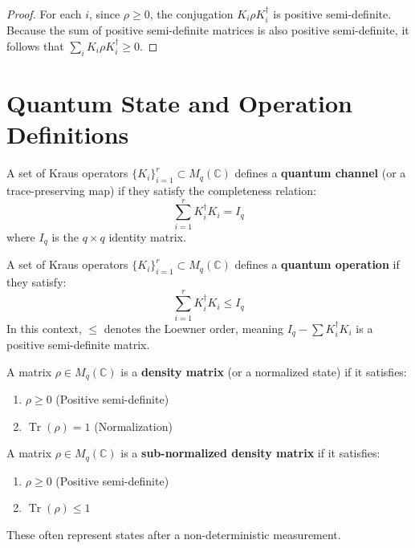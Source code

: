 \begin{proof}
For each $i$, since $\rho \ge 0$, the conjugation $K_i \rho K_i^\dagger$ is positive semi-definite. Because the sum of positive semi-definite matrices is also positive semi-definite, it follows that $\sum_{i} K_i \rho K_i^\dagger \ge 0$.
\end{proof}

\section*{Quantum State and Operation Definitions}

\begin{definition}
A set of Kraus operators $\{K_i\}_{i=1}^r \subset M_q(\mathbb{C})$ defines a \textbf{quantum channel} (or a trace-preserving map) if they satisfy the completeness relation:
\begin{equation}
    \sum_{i=1}^r K_i^\dagger K_i = I_q
\end{equation}
where $I_q$ is the $q \times q$ identity matrix.
\end{definition}

\begin{definition}
A set of Kraus operators $\{K_i\}_{i=1}^r \subset M_q(\mathbb{C})$ defines a \textbf{quantum operation} if they satisfy:
\begin{equation}
    \sum_{i=1}^r K_i^\dagger K_i \le I_q
\end{equation}
In this context, $\le$ denotes the Loewner order, meaning $I_q - \sum K_i^\dagger K_i$ is a positive semi-definite matrix.
\end{definition}

\begin{definition}
A matrix $\rho \in M_q(\mathbb{C})$ is a \textbf{density matrix} (or a normalized state) if it satisfies:
\begin{enumerate}
    \item $\rho \ge 0$ (Positive semi-definite)
    \item $\operatorname{Tr}(\rho) = 1$ (Normalization)
\end{enumerate}
\end{definition}

\begin{definition}
A matrix $\rho \in M_q(\mathbb{C})$ is a \textbf{sub-normalized density matrix} if it satisfies:
\begin{enumerate}
    \item $\rho \ge 0$ (Positive semi-definite)
    \item $\operatorname{Tr}(\rho) \le 1$
\end{enumerate}
These often represent states after a non-deterministic measurement.
\end{definition}

